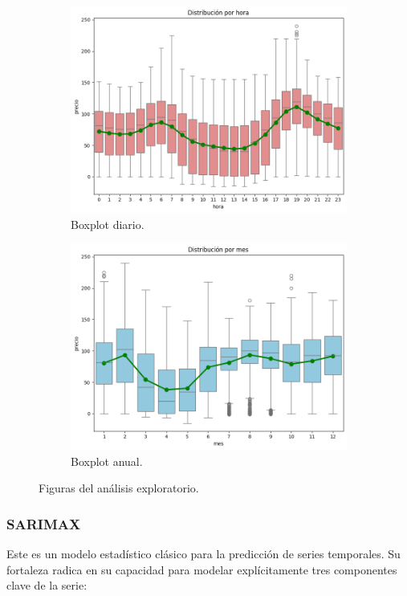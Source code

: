 \begin{figure}[H]
\begin{subfigure}[b]{0.4\textwidth}
\includegraphics[width=\textwidth]{figuras/boxplot_diario.png}
\caption[Boxplot diario]{Boxplot diario.}
\label{Booxplotdiario}
\end{subfigure}
\begin{subfigure}[b]{0.4\textwidth}
\centering
\includegraphics[width=\textwidth]{figuras/boxplot_anual.png}
\caption[Boxplot anual]{Boxplot anual.}
\label{Boxplotanual}
\end{subfigure}
\caption{Figuras del análisis exploratorio.}
\label{Análisis exploratorio}
\end{figure}
%
%
%
\subsubsection{SARIMAX}
%
%
%
Este es un modelo estadístico clásico para la predicción de series temporales. Su fortaleza radica en su capacidad para modelar explícitamente tres componentes clave de la serie:

